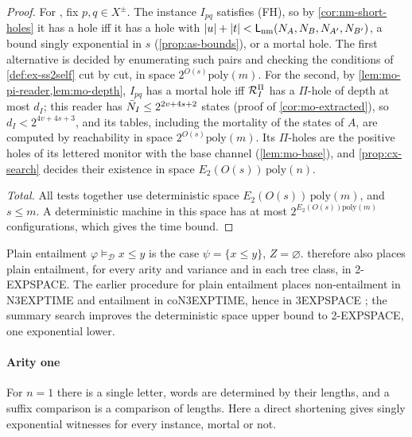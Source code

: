 \begin{proof}
For \CondII, fix $p,q\in X^\pm$. The instance $I_{pq}$ satisfies (FH), so by
\cref{cor:nm-short-holes} it has a hole iff it has a hole with
$\lvert u\rvert+\lvert t\rvert<\mathsf L_{\mathrm{nm}}(N_A,N_B,N_{A'},N_{B'})$, a bound singly exponential in $s$ (\cref{prop:as-bounds}), or a mortal hole. The first
alternative is decided by enumerating such pairs and checking the conditions of
\cref{def:ex-ss2self} cut by cut, in space $2^{O(s)}\mathrm{poly}(m)$. For the
second, by \cref{lem:mo-pi-reader,lem:mo-depth}, $I_{pq}$ has a mortal hole iff
$\mathcal{R}^{\Pi}_I$ has a $\Pi$-hole of depth at most $d_I$; this reader has
$\bar N_I\le2^{2v+4s+2}$ states (proof of \cref{cor:mo-extracted}), so
$d_I<2^{4v+4s+3}$, and its tables, including the mortality of the states of $A$,
are computed by reachability in space $2^{O(s)}\mathrm{poly}(m)$. Its
$\Pi$-holes are the positive holes of its lettered monitor with the base channel
(\cref{lem:mo-base}), and \cref{prop:cx-search} decides their existence in space
$E_2(O(s))\,\mathrm{poly}(n)$.

\emph{Total.} All tests together use deterministic space
$E_2(O(s))\,\mathrm{poly}(m)$, and $s\le m$. A deterministic machine in this space
has at most $2^{E_2(O(s))\mathrm{poly}(m)}$ configurations, which gives the time
bound.
\end{proof}

\begin{remark}\label{rem:cx-plain}
Plain entailment $\varphi\models_{\mathcal D}x\le y$ is the case
$\psi=\{x\le y\}$, $Z=\varnothing$.  therefore also places
plain entailment, for every arity and variance and in each tree class, in
2-EXPSPACE. The earlier procedure for plain entailment places non-entailment in
N3EXPTIME and
entailment in coN3EXPTIME, hence in 3EXPSPACE
; the summary search improves
the deterministic space upper bound to 2-EXPSPACE, one exponential lower.
\end{remark}

\paragraph{Arity one}
For $n=1$ there is a single letter, words are determined by their lengths, and
a suffix comparison is a comparison of lengths. Here a direct shortening gives
singly exponential witnesses for every instance, mortal or not.

